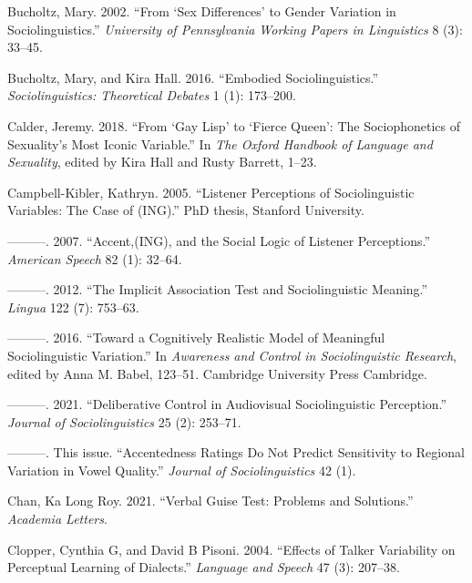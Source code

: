 \documentclass[
  letterpaper,
  DIV=11,
  numbers=noendperiod]{scrartcl}
\newlength{\cslhangindent}
\newenvironment{CSLReferences}[2] %
 {\begin{list}{}{%
  \setlength{\itemindent}{0pt}
  \setlength{\leftmargin}{0pt}
  \setlength{\parsep}{0pt}
  \ifodd #1
   \setlength{\leftmargin}{\cslhangindent}
   \setlength{\itemindent}{-1\cslhangindent}
  \fi
  \setlength{\itemsep}{#2\baselineskip}}}
 {\end{list}}
\begin{document}
\begin{CSLReferences}{1}{0}
Bucholtz, Mary. 2002. {``From {`Sex Differences'} to Gender Variation in
Sociolinguistics.''} \emph{University of Pennsylvania Working Papers in
Linguistics} 8 (3): 33--45.

Bucholtz, Mary, and Kira Hall. 2016. {``Embodied Sociolinguistics.''}
\emph{Sociolinguistics: Theoretical Debates} 1 (1): 173--200.

Calder, Jeremy. 2018. {``From {`Gay Lisp'} to {`Fierce Queen'}: The
Sociophonetics of Sexuality's Most Iconic Variable.''} In \emph{The
Oxford Handbook of Language and Sexuality}, edited by Kira Hall and
Rusty Barrett, 1--23.

Campbell-Kibler, Kathryn. 2005. {``Listener Perceptions of
Sociolinguistic Variables: The Case of (ING).''} PhD thesis, Stanford
University.

---------. 2007. {``Accent,(ING), and the Social Logic of Listener
Perceptions.''} \emph{American Speech} 82 (1): 32--64.

---------. 2012. {``The Implicit Association Test and Sociolinguistic
Meaning.''} \emph{Lingua} 122 (7): 753--63.

---------. 2016. {``Toward a Cognitively Realistic Model of Meaningful
Sociolinguistic Variation.''} In \emph{Awareness and Control in
Sociolinguistic Research}, edited by Anna M. Babel, 123--51. Cambridge
University Press Cambridge.

---------. 2021. {``Deliberative Control in Audiovisual Sociolinguistic
Perception.''} \emph{Journal of Sociolinguistics} 25 (2): 253--71.

---------. This issue. {``Accentedness Ratings Do Not Predict
Sensitivity to Regional Variation in Vowel Quality.''} \emph{Journal of
Sociolinguistics} 42 (1).

Chan, Ka Long Roy. 2021. {``Verbal Guise Test: Problems and
Solutions.''} \emph{Academia Letters}.

Clopper, Cynthia G, and David B Pisoni. 2004. {``Effects of Talker
Variability on Perceptual Learning of Dialects.''} \emph{Language and
Speech} 47 (3): 207--38.


\end{CSLReferences}
\end{document}
